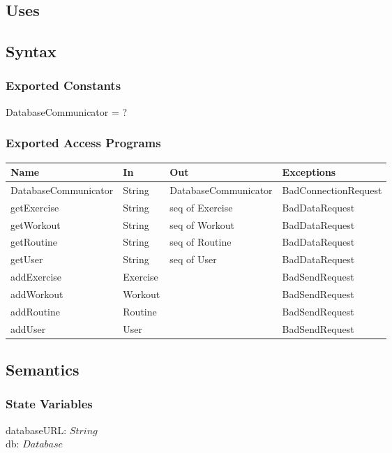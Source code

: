 \documentclass[12pt, titlepage]{article}
\begin{document}
\subsection{Uses}

\subsection{Syntax}

\subsubsection{Exported Constants}
DatabaseCommunicator = ?
\subsubsection{Exported Access Programs}

\begin{center}
	\begin{tabular}{p{4cm} p{4cm} p{4cm} p{2cm}}
		\hline
		\textbf{Name} & \textbf{In} & \textbf{Out} & \textbf{Exceptions} \\
		\hline
		DatabaseCommunicator & String & DatabaseCommunicator & BadConnectionRequest \\
		getExercise & String & seq of Exercise & BadDataRequest \\
		getWorkout & String & seq of Workout & BadDataRequest \\
		getRoutine & String & seq of Routine & BadDataRequest \\
		getUser & String & seq of User & BadDataRequest \\
		addExercise & Exercise &  & BadSendRequest \\
		addWorkout & Workout &  & BadSendRequest \\
		addRoutine & Routine &  & BadSendRequest \\
		addUser & User &  & BadSendRequest \\
		\hline
	\end{tabular}
\end{center}

\subsection{Semantics}

\subsubsection{State Variables}
databaseURL: $String$ \\
db: $Database$
\end{document}
